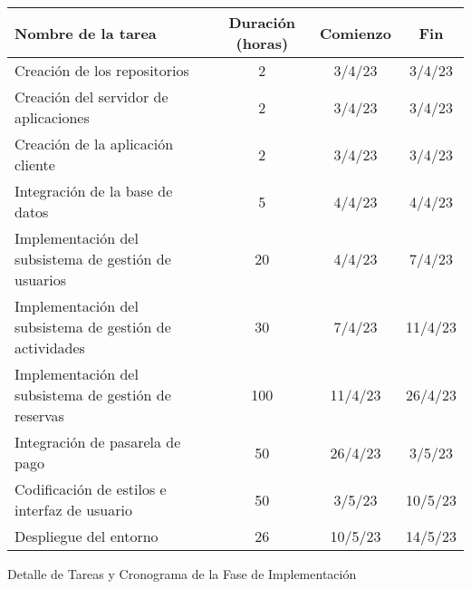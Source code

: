 \begin{planificacion}
	\centering
	\begin{tabular}{ | m{9cm} | c | c | c |}
		\hline
		\textbf{Nombre de la tarea}                             & \textbf{Duración (horas)} & \textbf{Comienzo} & \textbf{Fin} \\
		\hline
		Creación de los repositorios                            & 2                         & 3/4/23            & 3/4/23       \\
		\hline
		Creación del servidor de aplicaciones                   & 2                         & 3/4/23            & 3/4/23       \\
		\hline
		Creación de la aplicación cliente                       & 2                         & 3/4/23            & 3/4/23       \\
		\hline
		Integración de la base de datos                         & 5                         & 4/4/23            & 4/4/23       \\
		\hline
		Implementación del subsistema de gestión de usuarios    & 20                        & 4/4/23            & 7/4/23       \\
		\hline
		Implementación del subsistema de gestión de actividades & 30                        & 7/4/23            & 11/4/23      \\
		\hline
		Implementación del subsistema de gestión de reservas    & 100                       & 11/4/23           & 26/4/23      \\
		\hline
		Integración de pasarela de pago                         & 50                        & 26/4/23           & 3/5/23       \\
		\hline
		Codificación de estilos e interfaz de usuario           & 50                        & 3/5/23            & 10/5/23      \\
		\hline
		Despliegue del entorno                                  & 26                        & 10/5/23           & 14/5/23      \\
		\hline
	\end{tabular}
	\caption{Detalle de Tareas y Cronograma de la Fase de Implementación}
\end{planificacion}